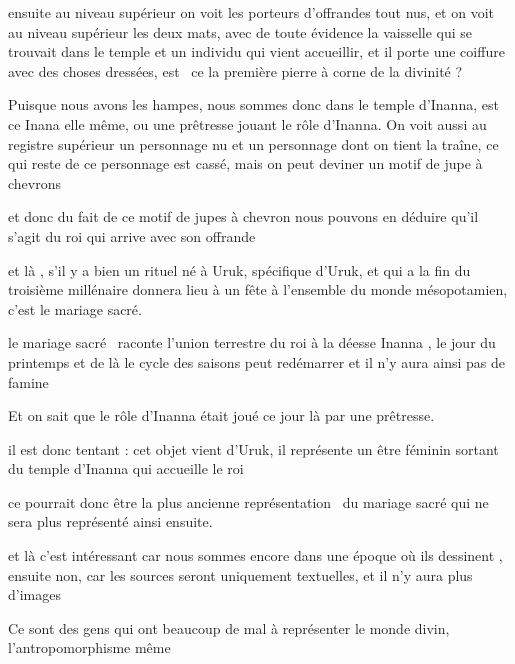 \documentclass[a4paper]{article}
\begin{document}
\bigskip

{
ensuite au niveau supérieur on voit les porteurs d'offrandes tout nus,
et on voit au niveau supérieur les deux mats, avec de toute évidence la
vaisselle qui se trouvait dans le temple et un individu qui vient
accueillir, et il porte une coiffure avec des choses dressées, est \ ce
la première pierre à corne de la divinité ?}

{
Puisque nous avons les hampes, nous sommes donc dans le temple d'Inanna,
est ce Inana elle même, ou une prêtresse jouant le rôle d'Inanna. On
voit aussi au registre supérieur un personnage nu et un personnage dont
on tient la traîne, ce qui reste de ce personnage est cassé, mais on
peut deviner un motif de jupe à chevrons}

{
et donc du fait de ce motif de jupes à chevron nous pouvons en déduire
qu'il s'agit du roi qui arrive avec son offrande}


\bigskip

{
et là , s'il y a bien un rituel né à Uruk, spécifique d'Uruk, et qui a
la fin du troisième millénaire donnera lieu à un fête à l'ensemble du
monde mésopotamien, c'est le mariage sacré.}


\bigskip

{
le mariage sacré \ raconte l'union terrestre du roi à la déesse Inanna ,
le jour du printemps et de là le cycle des saisons peut redémarrer et
il n'y aura ainsi pas de famine}

{
Et on sait que le rôle d'Inanna était joué ce jour là par une
prêtresse.}

{
il est donc tentant : cet objet vient d'Uruk, il représente un être
féminin sortant du temple d'Inanna qui accueille le roi}

{
ce pourrait donc être la plus ancienne représentation \ du mariage sacré
qui ne sera plus représenté ainsi ensuite.}

{
et là c'est intéressant car nous sommes encore dans une époque où ils
dessinent , ensuite non, car les sources seront uniquement textuelles,
et il n'y aura plus d'images}

{
Ce sont des gens qui ont beaucoup de mal à représenter le monde divin,
l'antropomorphisme même }


\bigskip


\bigskip
\end{document}
